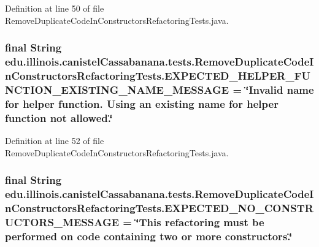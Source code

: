 Definition at line 50 of file RemoveDuplicateCodeInConstructorsRefactoringTests.java.

\hypertarget{classedu_1_1illinois_1_1canistelCassabanana_1_1tests_1_1RemoveDuplicateCodeInConstructorsRefactoringTests_a6f8cf4d45d976c0d1e82e0a89ca2ab99}{
\subsubsection[{EXPECTED\_\-HELPER\_\-FUNCTION\_\-EXISTING\_\-NAME\_\-MESSAGE}]{\setlength{\rightskip}{0pt plus 5cm}final String {\bf edu.illinois.canistelCassabanana.tests.RemoveDuplicateCodeInConstructorsRefactoringTests.EXPECTED\_\-HELPER\_\-FUNCTION\_\-EXISTING\_\-NAME\_\-MESSAGE} = \char`\"{}Invalid name for helper function. Using an existing name for helper function not allowed.\char`\"{}}}
\label{classedu_1_1illinois_1_1canistelCassabanana_1_1tests_1_1RemoveDuplicateCodeInConstructorsRefactoringTests_a6f8cf4d45d976c0d1e82e0a89ca2ab99}


Definition at line 52 of file RemoveDuplicateCodeInConstructorsRefactoringTests.java.

\hypertarget{classedu_1_1illinois_1_1canistelCassabanana_1_1tests_1_1RemoveDuplicateCodeInConstructorsRefactoringTests_ab3af05be15455583ceda71e6a6587049}{
\subsubsection[{EXPECTED\_\-NO\_\-CONSTRUCTORS\_\-MESSAGE}]{\setlength{\rightskip}{0pt plus 5cm}final String {\bf edu.illinois.canistelCassabanana.tests.RemoveDuplicateCodeInConstructorsRefactoringTests.EXPECTED\_\-NO\_\-CONSTRUCTORS\_\-MESSAGE} = \char`\"{}This refactoring must be performed on code containing two or more constructors.\char`\"{}}}
\label{classedu_1_1illinois_1_1canistelCassabanana_1_1tests_1_1RemoveDuplicateCodeInConstructorsRefactoringTests_ab3af05be15455583ceda71e6a6587049}


